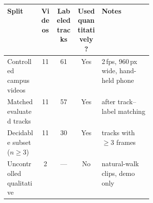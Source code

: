 \begin{tabular}{lcccp{0.35\linewidth}}
\toprule
Split & Videos & Labeled tracks & Used quantitatively? & Notes \\
\midrule
Controlled campus videos    & 11 & 61 & Yes & 2\,fps, 960\,px wide, hand-held phone \\
Matched evaluated tracks    & 11 & 57 & Yes & after track--label matching \\
Decidable subset ($n\!\ge\!3$) & 11 & 30 & Yes & tracks with $\geq 3$ frames \\
Uncontrolled qualitative    & 2 & --- & No & natural-walk clips, demo only \\
\bottomrule
\end{tabular}
